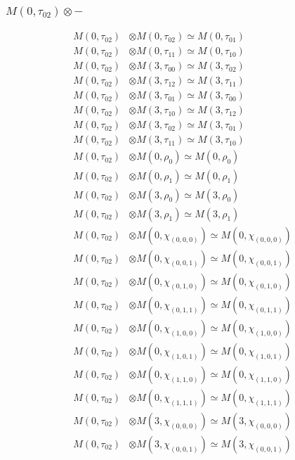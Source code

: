 \subsubsection{$ M(0,\tau_{02})\otimes -$}
\begin{align*}
M(0,\tau_{02}) &\otimes M(0,\tau_{02}) \simeq M(0,\tau_{01}) \\
M(0,\tau_{02}) &\otimes M(0,\tau_{11}) \simeq M(0,\tau_{10}) \\
M(0,\tau_{02}) &\otimes M(3,\tau_{00}) \simeq M(3,\tau_{02}) \\
M(0,\tau_{02}) &\otimes M(3,\tau_{12}) \simeq M(3,\tau_{11}) \\
M(0,\tau_{02}) &\otimes M(3,\tau_{01}) \simeq M(3,\tau_{00}) \\
M(0,\tau_{02}) &\otimes M(3,\tau_{10}) \simeq M(3,\tau_{12}) \\
M(0,\tau_{02}) &\otimes M(3,\tau_{02}) \simeq M(3,\tau_{01}) \\
M(0,\tau_{02}) &\otimes M(3,\tau_{11}) \simeq M(3,\tau_{10}) \\
M(0,\tau_{02}) &\otimes M(0,\rho_{0}) \simeq M(0,\rho_{0}) \\
M(0,\tau_{02}) &\otimes M(0,\rho_{1}) \simeq M(0,\rho_{1}) \\
M(0,\tau_{02}) &\otimes M(3,\rho_{0}) \simeq M(3,\rho_{0}) \\
M(0,\tau_{02}) &\otimes M(3,\rho_{1}) \simeq M(3,\rho_{1}) \\
M(0,\tau_{02}) &\otimes M(0,\chi_{(0,0,0)}) \simeq M(0,\chi_{(0,0,0)}) \\
M(0,\tau_{02}) &\otimes M(0,\chi_{(0,0,1)}) \simeq M(0,\chi_{(0,0,1)}) \\
M(0,\tau_{02}) &\otimes M(0,\chi_{(0,1,0)}) \simeq M(0,\chi_{(0,1,0)}) \\
M(0,\tau_{02}) &\otimes M(0,\chi_{(0,1,1)}) \simeq M(0,\chi_{(0,1,1)}) \\
M(0,\tau_{02}) &\otimes M(0,\chi_{(1,0,0)}) \simeq M(0,\chi_{(1,0,0)}) \\
M(0,\tau_{02}) &\otimes M(0,\chi_{(1,0,1)}) \simeq M(0,\chi_{(1,0,1)}) \\
M(0,\tau_{02}) &\otimes M(0,\chi_{(1,1,0)}) \simeq M(0,\chi_{(1,1,0)}) \\
M(0,\tau_{02}) &\otimes M(0,\chi_{(1,1,1)}) \simeq M(0,\chi_{(1,1,1)}) \\
M(0,\tau_{02}) &\otimes M(3,\chi_{(0,0,0)}) \simeq M(3,\chi_{(0,0,0)}) \\
M(0,\tau_{02}) &\otimes M(3,\chi_{(0,0,1)}) \simeq M(3,\chi_{(0,0,1)}) \\

\end{align*}
